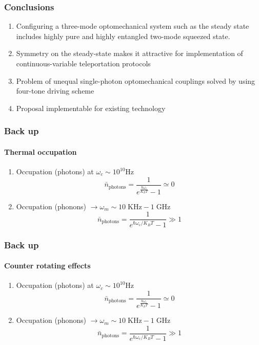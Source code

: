 \documentclass[aspectratio=43]{beamer}
\begin{document}
\begin{frame}

	\frametitle{Conclusions}
	
	\begin{enumerate}
		\item Configuring a three-mode optomechanical system such as the steady state includes highly pure and highly entangled two-mode squeezed state.
		\item Symmetry on the steady-state makes it attractive for implementation of  continuous-variable teleportation protocols
		\item Problem of unequal single-photon optomechanical couplings solved by using four-tone driving scheme
		\item Proposal implementable for existing technology
	\end{enumerate}
		
\end{frame}

\begin{frame}
	
	\frametitle{Back up}
	\framesubtitle{Thermal occupation}
	
	\begin{enumerate}
		\item Occupation (photons) at $\omega_{c} \sim 10^{10} \textrm{Hz}$
		\begin{equation}
			\bar{n}_{\textrm{photons}} = \frac{1}{e^{\frac{\hbar \omega_{c}}{K_{B}T}} - 1} \simeq 0 \nonumber
		\end{equation}
		\item Occupation (phonons) $\longrightarrow \omega_{m} \sim 10 \; \textrm{KHz} - 1 \; \textrm{GHz}$
		\begin{equation}
			\bar{n}_{\textrm{photons}} = \frac{1}{e^{\hbar \omega_{c} / K_{B}T} - 1} \gg 1 \nonumber
		\end{equation}
	\end{enumerate}

\end{frame}

\begin{frame}
	
	\frametitle{Back up}
	\framesubtitle{Counter rotating effects}
	
	\begin{enumerate}
		\item Occupation (photons) at $\omega_{c} \sim 10^{10} \textrm{Hz}$
		\begin{equation}
		\bar{n}_{\textrm{photons}} = \frac{1}{e^{\frac{\hbar \omega_{c}}{K_{B}T}} - 1} \simeq 0 \nonumber
		\end{equation}
		\item Occupation (phonons) $\longrightarrow \omega_{m} \sim 10 \; \textrm{KHz} - 1 \; \textrm{GHz}$
		\begin{equation}
		\bar{n}_{\textrm{photons}} = \frac{1}{e^{\hbar \omega_{c} / K_{B}T} - 1} \gg 1 \nonumber
		\end{equation}
	\end{enumerate}

\end{frame}
\end{document}
